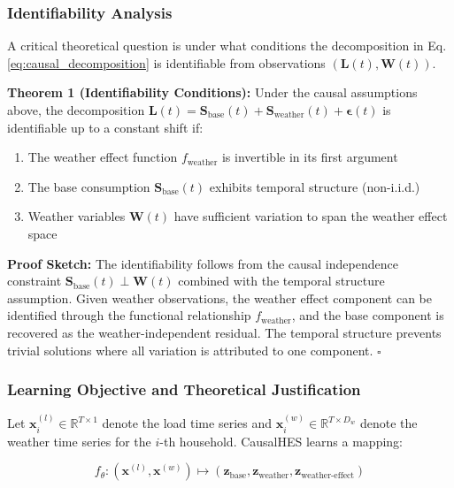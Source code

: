 \documentclass[journal]{IEEEtran}
\begin{document}
\subsubsection{Identifiability Analysis}

A critical theoretical question is under what conditions the decomposition in Eq. \ref{eq:causal_decomposition} is identifiable from observations $(\mathbf{L}(t), \mathbf{W}(t))$.

\textbf{Theorem 1 (Identifiability Conditions):} Under the causal assumptions above, the decomposition $\mathbf{L}(t) = \mathbf{S}_{\text{base}}(t) + \mathbf{S}_{\text{weather}}(t) + \boldsymbol{\epsilon}(t)$ is identifiable up to a constant shift if:
\begin{enumerate}
    \item The weather effect function $f_{\text{weather}}$ is invertible in its first argument
    \item The base consumption $\mathbf{S}_{\text{base}}(t)$ exhibits temporal structure (non-i.i.d.)
    \item Weather variables $\mathbf{W}(t)$ have sufficient variation to span the weather effect space
\end{enumerate}

\textbf{Proof Sketch:} The identifiability follows from the causal independence constraint $\mathbf{S}_{\text{base}}(t) \perp \mathbf{W}(t)$ combined with the temporal structure assumption. Given weather observations, the weather effect component can be identified through the functional relationship $f_{\text{weather}}$, and the base component is recovered as the weather-independent residual. The temporal structure prevents trivial solutions where all variation is attributed to one component. $\square$

\subsubsection{Learning Objective and Theoretical Justification}

Let $\mathbf{x}_i^{(l)} \in \mathbb{R}^{T \times 1}$ denote the load time series and $\mathbf{x}_i^{(w)} \in \mathbb{R}^{T \times D_w}$ denote the weather time series for the $i$-th household. CausalHES learns a mapping:

\begin{equation}
f_\theta: (\mathbf{x}^{(l)}, \mathbf{x}^{(w)}) \mapsto (\mathbf{z}_{\text{base}}, \mathbf{z}_{\text{weather}}, \mathbf{z}_{\text{weather-effect}})
\label{eq:causal_mapping}
\end{equation}
\end{document}
